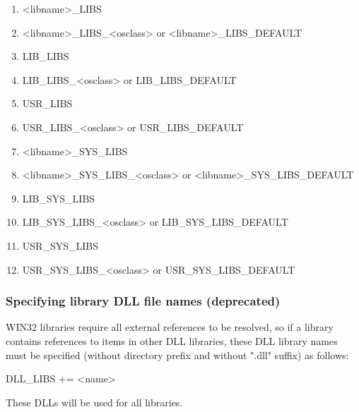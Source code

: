 \begin{enumerate}\item \textless{}libname\textgreater{}\_LIBS

\item \textless{}libname\textgreater{}\_LIBS\_\textless{}osclass\textgreater{} or \textless{}libname\textgreater{}\_LIBS\_DEFAULT

\item {}LIB\_LIBS

\item LIB\_LIBS\_\textless{}osclass\textgreater{} or LIB\_LIBS\_DEFAULT

\item {}USR\_LIBS

\item USR\_LIBS\_\textless{}osclass\textgreater{} or USR\_LIBS\_DEFAULT

\item \textless{}libname\textgreater{}\_SYS\_LIBS

\item \textless{}libname\textgreater{}\_SYS\_LIBS\_\textless{}osclass\textgreater{} or \textless{}libname\textgreater{}\_SYS\_LIBS\_DEFAULT

\item {}LIB\_SYS\_LIBS

\item LIB\_SYS\_LIBS\_\textless{}osclass\textgreater{} or LIB\_SYS\_LIBS\_DEFAULT

\item {}USR\_SYS\_LIBS

\item USR\_SYS\_LIBS\_\textless{}osclass\textgreater{} or USR\_SYS\_LIBS\_DEFAULT

\end{enumerate}\subsubsection{Specifying library DLL file names (deprecated)}

WIN32 libraries require all external references to be resolved, so if a library contains references to items in other DLL 
libraries, these DLL library names must be specified (without directory prefix and without ".dll" suffix) as follows:

\begin{description}\item {}DLL\_LIBS += \textless{}name\textgreater{}

\end{description}These DLLs will be used for all libraries.

